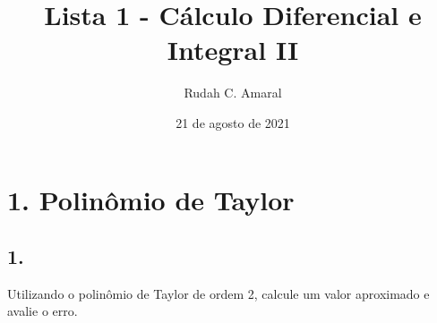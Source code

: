 \documentclass{article}
\author{Rudah C. Amaral}
\title{Lista 1 - Cálculo Diferencial e Integral II}
\date{21 de agosto de 2021}
\begin{document}
\maketitle
\clearpage


\tableofcontents
\label{TOC}
\clearpage


\pagestyle{fancy}
\setlength{\headheight}{16pt}


\section{1. Polinômio de Taylor}


\subsection{1.}
Utilizando o polinômio de Taylor de ordem 2, calcule um valor aproximado e
avalie o erro.
\end{document}
